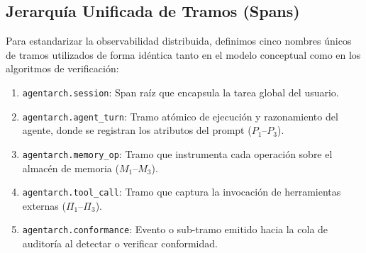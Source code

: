 \documentclass[conference]{IEEEtran}
\begin{document}
\subsection{Jerarqu\'ia Unificada de Tramos (Spans)}
Para estandarizar la observabilidad distribuida, definimos cinco nombres \'unicos de tramos utilizados de forma id\'entica tanto en el modelo conceptual como en los algoritmos de verificaci\'on:
\begin{enumerate}
    \item \texttt{agentarch.session}: Span ra\'iz que encapsula la tarea global del usuario.
    \item \texttt{agentarch.agent\_turn}: Tramo at\'omico de ejecuci\'on y razonamiento del agente, donde se registran los atributos del prompt ($P_1\text{--}P_3$).
    \item \texttt{agentarch.memory\_op}: Tramo que instrumenta cada operaci\'on sobre el almac\'en de memoria ($M_1\text{--}M_3$).
    \item \texttt{agentarch.tool\_call}: Tramo que captura la invocaci\'on de herramientas externas ($\Pi_1\text{--}\Pi_3$).
    \item \texttt{agentarch.conformance}: Evento o sub-tramo emitido hacia la cola de auditor\'ia al detectar o verificar conformidad.
\end{enumerate}
\end{document}
